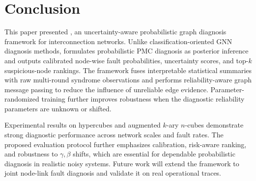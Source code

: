 \section{Conclusion}
\label{sec:conclusion}

This paper presented \tool, an uncertainty-aware probabilistic graph diagnosis framework for interconnection networks. Unlike classification-oriented GNN diagnosis methods, \tool formulates probabilistic PMC diagnosis as posterior inference and outputs calibrated node-wise fault probabilities, uncertainty scores, and top-$k$ suspicious-node rankings. The framework fuses interpretable statistical summaries with raw multi-round syndrome observations and performs reliability-aware graph message passing to reduce the influence of unreliable edge evidence. Parameter-randomized training further improves robustness when the diagnostic reliability parameters are unknown or shifted.

Experimental results on hypercubes and augmented $k$-ary $n$-cubes demonstrate strong diagnostic performance across network scales and fault rates. The proposed evaluation protocol further emphasizes calibration, risk-aware ranking, and robustness to $\gamma,\beta$ shifts, which are essential for dependable probabilistic diagnosis in realistic noisy systems. Future work will extend the framework to joint node-link fault diagnosis and validate it on real operational traces.